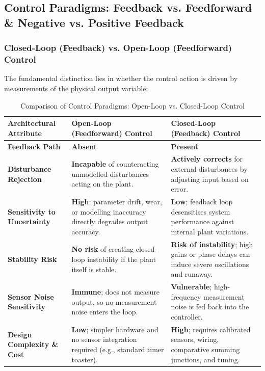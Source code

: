 \documentclass[12pt,onecolumn,twoside ]{article}
\begin{document}
	\subsection{Control Paradigms: Feedback vs. Feedforward \& Negative vs. Positive Feedback}
	\subsubsection{Closed-Loop (Feedback) vs. Open-Loop (Feedforward) Control}
	The fundamental distinction lies in whether the control action is driven by measurements of the physical output variable:
	\begin{table}[htbp]
		\centering
		\small
		\caption{Comparison of Control Paradigms: Open-Loop vs. Closed-Loop Control}
		\label{tab:open_vs_closed_loop}
		\begin{tabularx}{\textwidth}{L{0.6} L{1.2} L{1.2}}
			\toprule
			\textbf{Architectural Attribute} & \textbf{Open-Loop (Feedforward) Control} & \textbf{Closed-Loop (Feedback) Control} \\
			\midrule
			\textbf{Feedback Path} & \textbf{Absent}& \textbf{Present}\\
			\addlinespace[4pt]
			\textbf{Disturbance Rejection} & \textbf{Incapable} of counteracting unmodelled disturbances acting on the plant. & \textbf{Actively corrects} for external disturbances by adjusting input based on error. \\
			\addlinespace[4pt]
			\textbf{Sensitivity to Uncertainty} & \textbf{High}; parameter drift, wear, or modelling inaccuracy directly degrades output accuracy. & \textbf{Low}; feedback loop desensitises system performance against internal plant variations. \\
			\addlinespace[4pt]
			\textbf{Stability Risk} & \textbf{No risk} of creating closed-loop instability if the plant itself is stable. & \textbf{Risk of instability}; high gains or phase delays can induce severe oscillations and runaway. \\
			\addlinespace[4pt]
			\textbf{Sensor Noise Sensitivity} & \textbf{Immune}; does not measure output, so no measurement noise enters the loop. & \textbf{Vulnerable}; high-frequency measurement noise is fed back into the controller. \\
			\addlinespace[4pt]
			\textbf{Design Complexity \& Cost} & \textbf{Low}; simpler hardware and no sensor integration required (e.g., standard timer toaster). & \textbf{High}; requires calibrated sensors, wiring, comparative summing junctions, and tuning. \\
			\bottomrule
		\end{tabularx}
	\end{table}
\end{document}
